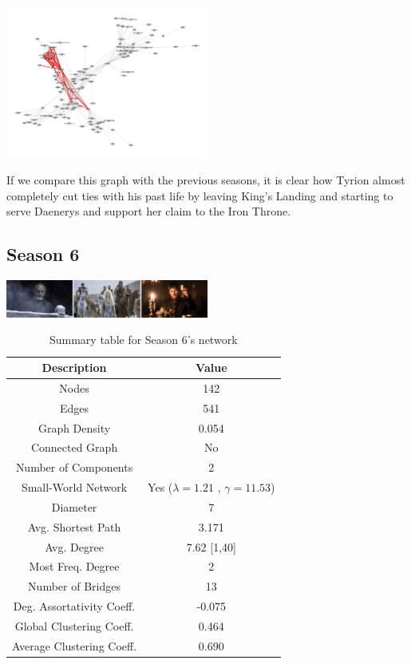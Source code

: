 \documentclass[10pt,twocolumn,letterpaper]{article}
\begin{document}
\begin{center}
    \includegraphics[width=0.5\textwidth]{img/s5/triangles_tyrion.jpg}
\end{center}

If we compare this graph with the previous seasons, it is clear how Tyrion almost completely cut ties with his past life by leaving King's Landing and starting to serve Daenerys and support her claim to the Iron Throne. 


\subsection{Season 6}

\begin{center}
    \includegraphics[width=0.5\textwidth]{img/s6/s6_frames.jpg}
\end{center}


\begin{table}[!h]
    \centering
    \small
    \begin{tabular}{c|c}
        Description & Value  \\
        \hline
        Nodes & 142\\
        Edges & 541 \\
        Graph Density & 0.054 \\
        Connected Graph & No \\
        Number of Components & 2 \\
        Small-World Network & Yes ($\lambda=1.21$ , $\gamma=11.53$) \\
        Diameter & 7 \\
        Avg. Shortest Path & 3.171 \\
        Avg. Degree & 7.62 [1,40] \\
        Most Freq. Degree & 2 \\
        Number of Bridges & 13 \\
        Deg. Assortativity Coeff. & -0.075\\
        Global Clustering Coeff. & 0.464 \\
        Average Clustering Coeff. & 0.690 \\
        \hline 
    \end{tabular}
    \vspace{0.2cm}
    \caption{Summary table for Season 6's network}
    \label{tab:my_label}
\end{table} \\
\end{document}
